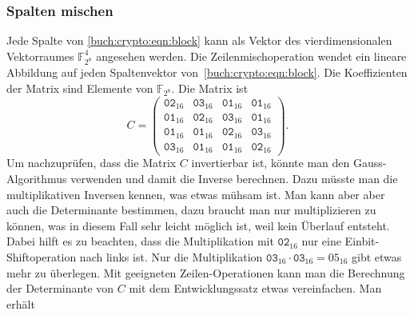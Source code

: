 \subsubsection{Spalten mischen}
Jede Spalte von \eqref{buch:crypto:eqn:block} kann als Vektor des
vierdimensionalen Vektorraumes $\mathbb{F}_{2^8}^4$ angesehen werden.
Die Zeilenmischoperation wendet ein lineare Abbildung auf jeden
Spaltenvektor von~\eqref{buch:crypto:eqn:block}.
Die Koeffizienten der Matrix sind Elemente von $\mathbb{F}_{2^8}$.
Die Matrix ist
\[
C=\begin{pmatrix}
\texttt{02}_{16}&\texttt{03}_{16}&\texttt{01}_{16}&\texttt{01}_{16}\\
\texttt{01}_{16}&\texttt{02}_{16}&\texttt{03}_{16}&\texttt{01}_{16}\\
\texttt{01}_{16}&\texttt{01}_{16}&\texttt{02}_{16}&\texttt{03}_{16}\\
\texttt{03}_{16}&\texttt{01}_{16}&\texttt{01}_{16}&\texttt{02}_{16}
\end{pmatrix}.
\]
Um nachzuprüfen, dass die Matrix $C$ invertierbar ist, könnte man den
Gauss-Algorithmus verwenden und damit die Inverse berechnen.
Dazu müsste man die multiplikativen Inversen kennen, was etwas mühsam
ist.
Man kann aber aber auch die Determinante bestimmen, dazu braucht man
nur multiplizieren zu können, was in diesem Fall sehr leicht möglich ist,
weil kein Überlauf entsteht.
Dabei hilft es zu beachten, dass die Multiplikation mit $\texttt{02}_{16}$
nur eine Einbit-Shiftoperation nach links ist.
Nur die Multiplikation $\texttt{03}_{16}\cdot\texttt{03}_{16}=\text{05}_{16}$
gibt etwas mehr zu überlegen.
Mit geeigneten Zeilen-Operationen kann man die Berechnung der Determinante
von $C$ mit dem Entwicklungssatz etwas vereinfachen.
Man erhält
